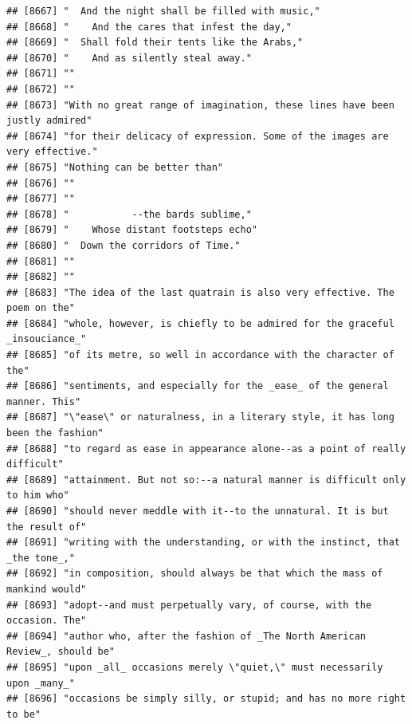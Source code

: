 \documentclass{article}\usepackage[]{graphicx}\usepackage[]{color}
\makeatletter
\newenvironment{kframe}{%
 \def\at@end@of@kframe{}%
 \ifinner\ifhmode%
  \def\at@end@of@kframe{\end{minipage}}%
  \begin{minipage}{\columnwidth}%
 \fi\fi%
 \def\FrameCommand##1{\hskip\@totalleftmargin \hskip-\fboxsep
 \colorbox{shadecolor}{##1}\hskip-\fboxsep
     \hskip-\linewidth \hskip-\@totalleftmargin \hskip\columnwidth}%
 \MakeFramed {\advance\hsize-\width
   \@totalleftmargin\z@ \linewidth\hsize
   \@setminipage}}%
 {\par\unskip\endMakeFramed%
 \at@end@of@kframe}
\newenvironment{knitrout}{}{} %
\makeatother
\begin{document}
\begin{knitrout}
\begin{kframe}
\begin{verbatim}
## [8667] "  And the night shall be filled with music,"                                 
## [8668] "    And the cares that infest the day,"                                      
## [8669] "  Shall fold their tents like the Arabs,"                                    
## [8670] "    And as silently steal away."                                             
## [8671] ""                                                                            
## [8672] ""                                                                            
## [8673] "With no great range of imagination, these lines have been justly admired"    
## [8674] "for their delicacy of expression. Some of the images are very effective."    
## [8675] "Nothing can be better than"                                                  
## [8676] ""                                                                            
## [8677] ""                                                                            
## [8678] "           --the bards sublime,"                                             
## [8679] "    Whose distant footsteps echo"                                            
## [8680] "  Down the corridors of Time."                                               
## [8681] ""                                                                            
## [8682] ""                                                                            
## [8683] "The idea of the last quatrain is also very effective. The poem on the"       
## [8684] "whole, however, is chiefly to be admired for the graceful _insouciance_"     
## [8685] "of its metre, so well in accordance with the character of the"               
## [8686] "sentiments, and especially for the _ease_ of the general manner. This"       
## [8687] "\"ease\" or naturalness, in a literary style, it has long been the fashion"  
## [8688] "to regard as ease in appearance alone--as a point of really difficult"       
## [8689] "attainment. But not so:--a natural manner is difficult only to him who"      
## [8690] "should never meddle with it--to the unnatural. It is but the result of"      
## [8691] "writing with the understanding, or with the instinct, that _the tone_,"      
## [8692] "in composition, should always be that which the mass of mankind would"       
## [8693] "adopt--and must perpetually vary, of course, with the occasion. The"         
## [8694] "author who, after the fashion of _The North American Review_, should be"     
## [8695] "upon _all_ occasions merely \"quiet,\" must necessarily upon _many_"         
## [8696] "occasions be simply silly, or stupid; and has no more right to be"           

\end{verbatim}
\end{kframe}
\end{knitrout}
\end{document}
